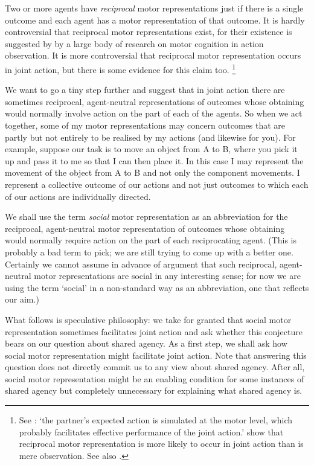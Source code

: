 \documentclass[12pt,\papersize]{extarticle}
\begin{document}
Two or more agents have \emph{reciprocal} motor representations  just if there is a single outcome and each agent has a motor representation of that outcome. 
It is hardly controversial that reciprocal motor representations exist, for their existence is suggested by by a large body of research on motor cognition in action observation.
It is more controversial that reciprocal motor representation occurs in joint action, but there is some evidence for this claim too.%
\footnote{
See \citet{kourtis:2012_predictive}: `the partner’s expected action is simulated at the motor level, which probably facilitates effective performance of the joint action.'
\citet{kourtis:2010_favoritism} show that 
reciprocal motor representation is more likely to occur in joint action than is mere observation. 
See also \citet{Knoblich:2003nf}.
 }

We want to go a tiny step further and suggest that in joint action there are sometimes reciprocal, agent-neutral representations of outcomes whose obtaining would normally involve action on the part of each of the agents.
So when we act together, some of my motor representations may concern outcomes that are partly but not entirely to be realised by my actions (and likewise for you).
For example, suppose our task is to move an object from A to B, where you pick it up and pass it to me so that I can then place it.
In this case I may represent the movement of the object from A to B and not only the component movements.
I represent a collective outcome of our actions and not just outcomes to which each of our actions are individually directed.
%

We shall use the term \emph{social} motor representation as an abbreviation for the reciprocal, agent-neutral motor representation of outcomes whose obtaining would normally require action on the part of each reciprocating agent.
(This is probably a bad term to pick; we are still trying to come up with a better one. 
Certainly we cannot assume in advance of argument that such reciprocal, agent-neutral motor representations are social in any interesting sense;
for now we are using the term `social' in a non-standard way as an abbreviation, one that reflects our aim.)

What follows is speculative philosophy: we take for granted that  social motor representation sometimes facilitates joint action and ask whether this conjecture bears on our question about shared agency.
As a first step, we shall ask how social motor representation might facilitate joint action.
Note that answering this question does not directly commit us to any view about shared agency.
After all, social motor representation might be an enabling condition for some instances of shared agency but completely unnecessary for explaining what shared agency is.
\end{document}
